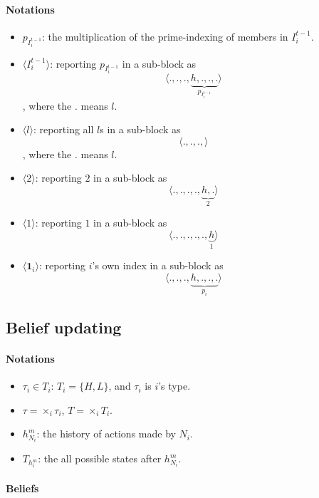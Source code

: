 \documentclass[12pt]{article}
\theoremstyle{remark}
\theoremstyle{remark}
\begin{document}




\paragraph{Notations}

\begin{itemize}
\item $p_{I^{t-1}_i}$: the multiplication of the prime-indexing of members in $I^{t-1}_i$.
\item $\langle I^{t-1}_i \rangle$: reporting $p_{I^{t-1}_i}$ in a sub-block as
\[\langle .,.,.,\underbrace{h,.,.,.}_{p_{I^{t-1}_i}}\rangle\] 
, where the $.$ means $l$.
\item $\langle l \rangle$: reporting all $l$s in a sub-block as
\[\langle .,.,.,\rangle\] 
, where the $.$ means $l$.
\item $\langle 2 \rangle$: reporting $2$ in a sub-block as
\[\langle .,.,.,.,\underbrace{h,.}_{2}\rangle\] 
\item $\langle 1 \rangle$: reporting $1$ in a sub-block as
\[\langle .,.,.,.,.,\underbrace{h}_{1}\rangle\] 
\item $\langle \mathbf{1}_i \rangle$: reporting $i$'s own index in a sub-block as
\[\langle .,.,.,\underbrace{h,.,.,.}_{p_i}\rangle\]  
\end{itemize}


\subsection{Belief updating}

\paragraph{Notations}
\begin{itemize}
\item $\tau_i \in T_i$: $T_i=\{H,L\}$, and $\tau_i$ is $i$'s type.
\item $\tau=\times_{i}\tau_i$, $T=\times_{i}T_i$.
\item $h^m_{N_i}$: the history of actions made by $N_i$.
\item $T_{h^{m}_i}$: the all possible states after $h^m_{N_i}$.
\end{itemize}

\paragraph{Beliefs}
\end{document}
